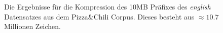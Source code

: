 \begin{figure}
{
    }
    \caption{Die Ergebnisse für die Kompression des 10MB Präfixes des \emph{english} Datensatzes aus dem Pizza\&Chili Corpus. Dieses besteht aus $\approx10.7$ Millionen Zeichen.}
    \label{resultsenglish10}
\end{figure}


